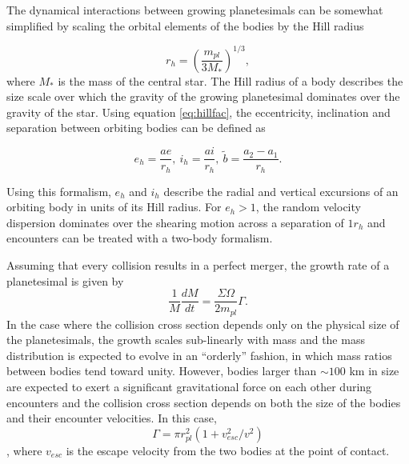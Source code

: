 \documentclass[twocolumn,linenumbers]{aastex63}
\begin{document}
The dynamical interactions between growing planetesimals can be somewhat simplified by scaling the orbital elements of the bodies by
the Hill radius

\begin{equation}\label{eq:hillfac}
	r_{h} = \left(\frac{m_{pl}}{3 M_{*}}\right)^{1/3}, 
\end{equation}
\noindent where $M_{*}$ is the mass of the central star. The Hill radius of a body describes the size scale over which the gravity of the growing planetesimal dominates over the gravity of the star. Using equation \ref{eq:hillfac}, the eccentricity, inclination and separation between orbiting bodies can be defined as

\begin{equation}\label{eq:hillorb}
	e_{h} = \frac{a e}{r_{h}}, \: i_{h} = \frac{a i}{r_{h}}, \: \tilde{b} = \frac{a_{2} - a_{1}}{r_{h}}.
\end{equation}

\noindent Using this formalism, $e_{h}$ and $i_{h}$ describe the radial and vertical excursions of an orbiting body in units of its Hill radius. For $e_{h} > 1$, the random velocity dispersion dominates over the shearing motion across a separation of $1 r_{h}$ and encounters can be treated with a two-body formalism.

Assuming that every collision results in a perfect merger, the growth rate of a planetesimal is given by
\begin{equation}\label{eq:growth}
	\frac{1}{M}\frac{dM}{dt} = \frac{\Sigma \Omega}{2 m_{pl}} \Gamma.
\end{equation}
\noindent In the case where the collision cross section depends only
on the physical size of the planetesimals, the growth scales sub-linearly
with mass and the mass distribution is expected to evolve in an
``orderly'' fashion, in which mass ratios between bodies tend toward unity. However, bodies larger than $\sim 100$ km in size are expected to exert a significant gravitational force on each other during encounters and the collision cross section depends on both the size of the bodies and their encounter velocities. In this case, 
\begin{equation}\label{eq:gravfocus}
	\Gamma = \pi r_{pl}^2 \left( 1 + v_{esc}^2 / v^2 \right)
\end{equation}
\citep{safronov69}, where $v_{esc}$ is the escape velocity from the two bodies at the point of contact.
\end{document}
